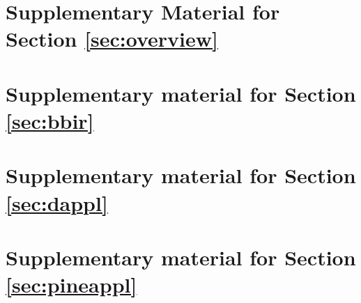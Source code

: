 
\newpage
\section{Supplementary Material for Section \ref{sec:overview}}




\newpage
\section{Supplementary material for Section \ref{sec:bbir}}
% 





\newpage
\section{Supplementary material for Section \ref{sec:dappl}}








\newpage
\section{Supplementary material for Section \ref{sec:pineappl}}


% 


% 